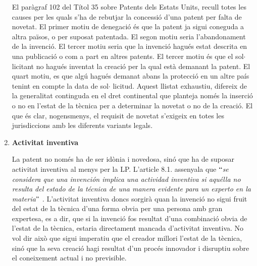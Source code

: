 \documentclass[12pt]{article}
\begin{document}
\begin{enumerate}
\vspace{\baselineskip}
\begin{justify}
El paràgraf 102 del Títol 35 sobre Patents dels Estats Units, recull totes les causes per les quals s’ha de rebutjar la concessió d’una patent per falta de novetat. El primer motiu de denegació és que la patent ja sigui coneguda a altra països, o per suposat patentada. El segon motiu seria l’abandonament de la invenció. El tercer motiu seria que la invenció hagués estat descrita en una publicació o com a part en altres patents. El tercer motiu és que el sol$ \cdot $ licitant no hagués inventat la creació per la qual està demanant la patent. El quart motiu, es que algú hagués demanat abans la protecció en un altre país tenint en compte la data de sol$ \cdot $ licitud. Aquest llistat exhaustiu, difereix de la generalitat continguda en el dret continental que planteja només la inserció o no en l’estat de la tècnica per a determinar la novetat o no de la creació. El que és clar, nogensmenys, el requisit de novetat s’exigeix en totes les jurisdiccions amb les diferents variants legals. 
\end{justify}\par


\vspace{\baselineskip}
	\item \textbf{Activitat inventiva}\par


\vspace{\baselineskip}
La patent no només ha de ser idònia i novedosa, sinó que ha de suposar activitat inventiva al menys per la LP. L’article 8.1. assenyala que $``$\textit{se considera que una invención implica una actividad inventiva si aquélla no resulta del estado de la técnica de una manera evidente para un experto en la materia$"$ . }L’activitat inventiva doncs sorgirà quan la invenció no sigui fruit del estat de la tècnica d’una forma obvia per una persona amb gran expertesa, es a dir, que si la invenció fos resultat d’una combinació obvia de l’estat de la tècnica, estaria directament mancada d’activitat inventiva. No vol dir això que sigui imperatiu que el creador millori l’estat de la tècnica, sinó que la seva creació hagi resultat d’un procés innovador i disruptiu sobre el coneixement actual i no previsible. \par



\end{enumerate}
\end{document}
